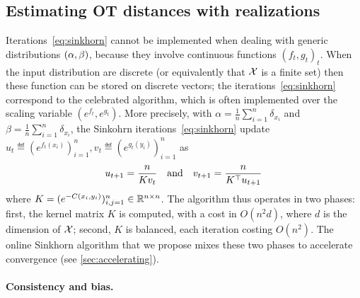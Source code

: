 \subsection{Estimating OT distances with realizations}

Iterations~\eqref{eq:sinkhorn} cannot be implemented when dealing with generic distributions $(\alpha,\beta)$, because they involve continuous functions ${(f_t,g_t)}_t$. 
%
When the input distribution are discrete (or equivalently that $\mathcal{X}$ is a finite
set) then these function can be stored on discrete vectors;
the iterations~\eqref{eq:sinkhorn} correspond to the celebrated
\citet{sinkhorn1967concerning} algorithm, which is often implemented over the scaling
variable $(e^{f_t},e^{g_t})$.
%
More precisely, with $\alpha =
\frac{1}{n}\sum_{i=1}^n \delta_{x_i}$ and $\beta = \frac{1}{n} \sum_{i=1}^n
\delta_{x_i}$, the Sinkohrn iterations~\eqref{eq:sinkhorn} update $u_t \eqdef
(e^{f_t(x_i)})_{i=1}^n, v_t \eqdef (e^{g_t(y_i)})_{i=1}^n$ as
\begin{equation*}
	u_{t+1} = \frac{n}{ K v_t }
	\quad \text{and} \quad
	v_{t+1} = \frac{n}{ K^\top u_{t+1} }
\end{equation*}
where $K=(e^{-C(x_i,y_i)})_{i,j=1}^n \in \mathbb{R}^{n \times n}$. The algorithm thus
operates in two phases: first, the kernel matrix $K$ is computed, with a cost in
$O(n^2 d)$, where $d$ is the dimension of $\mathcal{X}$; second, $K$ is balanced, each
iteration costing $O(n^2)$. The online Sinkhorn algorithm that we propose mixes
these two phases to accelerate convergence (see \autoref{sec:accelerating}).


\paragraph{Consistency and bias.}\label{sec:gradient}

